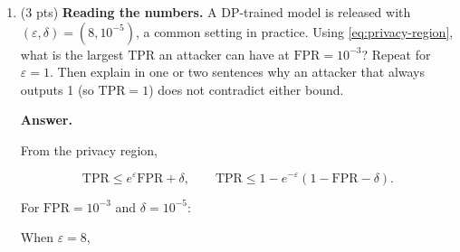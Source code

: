 \documentclass[11pt]{article}
\newcommand{\cA}{\mathcal{A}}
\newcommand{\FPR}{\mathrm{FPR}}
\newcommand{\TPR}{\mathrm{TPR}}
\newcommand{\eps}{\varepsilon}
\newenvironment{answer}{\par\medskip\noindent\textbf{Answer.}\ }{\par\bigskip}
\begin{document}
\begin{enumerate}
\begin{answer}

First, consider a deterministic test $T$.
Let $S=\{y:T(y)=1\}$. By definition,

\[
\FPR=\Pr(\cA(D)\in S),
\qquad
\TPR=\Pr(\cA(D')\in S).
\]

Since $\cA$ is $(\eps,\delta)$-DP
and $D,D'$ are adjacent,

\[
\Pr(\cA(D')\in S)
\le e^\eps\Pr(\cA(D)\in S)+\delta.
\]

Therefore,

\[
\TPR\le e^\eps\FPR+\delta.
\]

Now consider the complement $S^c$.
We have

\[
1-\FPR=\Pr(\cA(D)\in S^c),
\qquad
1-\TPR=\Pr(\cA(D')\in S^c).
\]

Applying the DP guarantee in the other direction,

\[
\Pr(\cA(D)\in S^c)
\le e^\eps\Pr(\cA(D')\in S^c)+\delta.
\]

Thus,

\[
1-\FPR\le e^\eps(1-\TPR)+\delta.
\]

For a randomized test $T$, by the randomized
post-processing theorem from part (b),
$T\circ\cA$ is also $(\eps,\delta)$-DP.
Applying the same inequalities to the
output events $\{1\}$ and $\{0\}$
gives the two bounds.

Hence, every deterministic or randomized
attacker satisfies

\[
\boxed{
\TPR\le e^\eps\FPR+\delta,
\qquad
1-\FPR\le e^\eps(1-\TPR)+\delta.
}
\]

\end{answer}

\item (3 pts) \textbf{Reading the numbers.} A DP-trained model is released
with $(\eps,\delta)=(8,10^{-5})$, a common setting in practice. Using
\eqref{eq:privacy-region}, what is the largest $\TPR$ an attacker can have at
$\FPR=10^{-3}$? Repeat for $\eps=1$. Then explain in one or two sentences why
an attacker that always outputs 1 (so $\TPR=1$) does not contradict either
bound.

\begin{answer}

From the privacy region,

\[
\TPR \le e^\eps \FPR+\delta,
\qquad
\TPR \le 1-e^{-\eps}(1-\FPR-\delta).
\]

For $\FPR=10^{-3}$ and $\delta=10^{-5}$:

When $\eps=8$,


\end{answer}
\end{enumerate}
\end{document}
